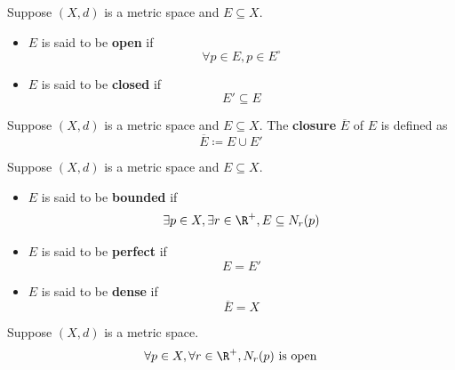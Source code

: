 \begin{definition} \label{an:def:open-closed-sets}
  Suppose $(X, d)$ is a metric space and $E \subseteq X$.
  \begin{itemize}
    \item $E$ is said to be \textbf{open} if
          \[
            \forall p \in E, p \in E^{\circ}
          \]
    \item $E$ is said to be \textbf{closed} if
          \[
            E' \subseteq E
          \]
  \end{itemize}
\end{definition}

\bigskip

\begin{definition} \label{an:def:closure}
  Suppose $(X, d)$ is a metric space and $E \subseteq X$. The \textbf{closure} $\overline{E}$ of $E$ is defined as
  \[
    \overline{E} \coloneqq E \cup E'
  \]
\end{definition}

\bigskip

\begin{definition} \label{an:def:bounded-perfect-dense-sets}
  Suppose $(X, d)$ is a metric space and $E \subseteq X$.
  \begin{itemize}
    \item $E$ is said to be \textbf{bounded} if
          \[
            \exists p \in X, \exists r \in \R^{+}, E \subseteq N_{r}(p)
          \]
    \item $E$ is said to be \textbf{perfect} if
          \[
            E = E'
          \]
    \item $E$ is said to be \textbf{dense} if
          \[
            \overline{E} = X
          \]
  \end{itemize}
\end{definition}

\bigskip

\begin{theorem} \label{an:thm:neighborhood-is-open}
  Suppose $(X, d)$ is a metric space.
  \[
    \forall p \in X, \forall r \in \R^{+}, N_{r}(p) \text{ is open}
  \]
\end{theorem}

